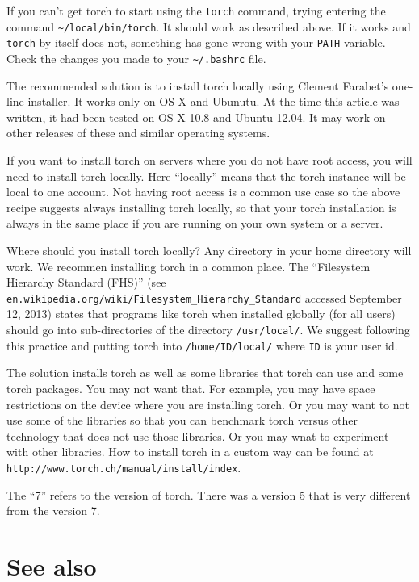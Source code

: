 \documentclass{article}
\let\code\texttt %
\begin{document}
If you can't get torch to start using the \code{torch} command, trying
entering the command \code{\textasciitilde/local/bin/torch}. It should
work as described above. If it works and \code{torch} by itself does
not, something has gone wrong with your \code{PATH} variable. Check the
changes you made to your \code{\textasciitilde/.bashrc} file.


The recommended solution is to install torch locally using Clement
Farabet's one-line installer. It works only on OS X and
Ubunutu. At the time this article was written, it had been tested on OS
X 10.8 and Ubuntu 12.04. It may work on other releases of these and
similar operating systems.

If you want to install torch on servers where you do not have root
access, you will need to install torch locally. Here ``locally'' means
that the torch instance will be local to one account. Not having root
access is a common use case so the above recipe suggests always
installing torch locally, so that your torch installation is always in
the same place if you are running on your own system or a server.

Where should you install torch locally? Any directory in your home
directory will work. We recommen installing torch in a common place. The
``Filesystem Hierarchy Standard (FHS)'' (see \\
\code{en.wikipedia.org/wiki/Filesystem\_Hierarchy\_Standard} accessed
September 12, 2013) states that programs like torch when installed
globally (for all users) should go into sub-directories of the directory
\code{/usr/local/}. We suggest following this practice and putting torch
into \code{/home/ID/local/} where \code{ID} is your user id.  

The solution installs torch as well as some libraries that torch can use
and some torch packages. You may not want that. For example, you may
have space restrictions on the device where you are installing torch. Or
you may want to not use some of the libraries so that you can benchmark
torch versus other technology that does not use those libraries. Or you
may wnat to experiment with other libraries. How to
install torch in a custom way can be found at
\code{http://www.torch.ch/manual/install/index}. 

The ``7'' refers to the version of
torch. There was a version 5 that is very different from the version 7.

\section{See also}
\end{document}
